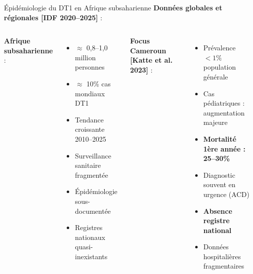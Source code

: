 \documentclass[11pt, aspectratio=169]{beamer}
\begin{document}
\begin{frame}{Épidémiologie du DT1 en Afrique subsaharienne}
  \textbf{Données globales et régionales [IDF 2020--2025]} :
  
  \vspace{0.8em}
  
  \begin{columns}[T]
    \textbf{\color{accent2} Afrique subsaharienne} :
    \begin{itemize}
      \item $\approx$ 0,8--1,0 million personnes
      \item $\approx$ 10\% cas mondiaux DT1
      \item Tendance croissante 2010--2025
      \item Surveillance sanitaire fragmentée
      \item Épidémiologie sous-documentée
      \item Registres nationaux quasi-inexistants
    \end{itemize}
    
    \textbf{\color{accent1} Focus Cameroun [Katte et al. 2023]} :
    \begin{itemize}
      \item Prévalence $<1\%$ population générale
      \item Cas pédiatriques : augmentation majeure
      \item \textbf{Mortalité 1ère année : 25--30\%}
      \item Diagnostic souvent en urgence (ACD)
      \item \textbf{Absence registre national}
      \item Données hospitalières fragmentaires
    \end{itemize}
  \end{columns}
\end{frame}
\end{document}
